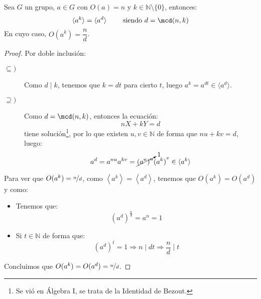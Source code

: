 \begin{prop}
    Sea $G$ un grupo, $a\in G$ con $O(a) = n$ y $k\in \mathbb{N}\setminus\{0\}$, entonces:
    \begin{equation*}
        \langle a^k \rangle  = \langle a^d \rangle \qquad \text{\ siendo\ } d = \mcd(n,k)
    \end{equation*}
    En cuyo caso, $O(a^k) = \dfrac{n}{d}$.
    \begin{proof}
        Por doble inclusión:
        \begin{description}
            \item [$\subseteq)$] Como $d\mid k$, tenemos que $k = dt$ para cierto $t$, luego $a^k = a^{dt}\in \langle a^d \rangle $.
            \item [$\supseteq)$] Como $d = \mcd(n,k)$, entonces la ecuación:
                \begin{equation*}
                    nX + kY = d
                \end{equation*}
                tiene solución\footnote{Se vió en Álgebra I, se trata de la Identidad de Bezout.}, por lo que existen $u,v\in \mathbb{N}$ de forma que $nu + kv = d$, luego:
                \begin{equation*}
                    a^d = a^{nu}a^{kv} = \cancelto{1}{{(a^n)}^{u}} {(a^{k})}^{v} \in \langle a^k \rangle 
                \end{equation*}
        \end{description}
        Para ver que $O(a^k) = \nicefrac{n}{d}$, como $\left\langle a^k \right\rangle = \left\langle a^d \right\rangle  $, tenemos que $O(a^k) = O(a^d)$ y como:
        \begin{itemize}
            \item Tenemos que:
                \begin{equation*}
                    {(a^d)}^{\frac{n}{d}} = a^n = 1
                \end{equation*}
            \item Si $t\in \mathbb{N}$ de forma que:
                \begin{equation*}
                    {(a^d)}^{t} = 1 \Longrightarrow n \mid dt \Longrightarrow \dfrac{n}{d}\mid t
                \end{equation*}
        \end{itemize}
        Concluimos que $O(a^k) = O(a^d)  = \nicefrac{n}{d} $.
    \end{proof}
\end{prop}

